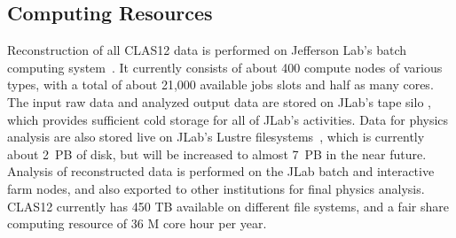 \subsection{Computing Resources}

Reconstruction of all CLAS12 data is performed on Jefferson Lab's batch computing system~\cite{jlab-batch-farm}.
It currently consists of about 400 compute nodes of various types, with a total of about 21,000 available jobs
slots and half as many cores.  The input raw data and analyzed output data are stored on JLab's tape silo
\cite{jlab-tape-silo}, which provides sufficient cold storage for all of JLab's activities.  Data for physics analysis are
also stored live on JLab's Lustre filesystems~\cite{jlab-lustre}, which is currently about 2~PB of disk, but will be
increased to almost 7~PB in the near future. Analysis of reconstructed data is performed on the JLab batch and
interactive farm nodes, and also exported to other institutions for final physics analysis.  
CLAS12 currently has  450 TB available on different file systems, and a fair share computing resource of 36 M core hour per year.
